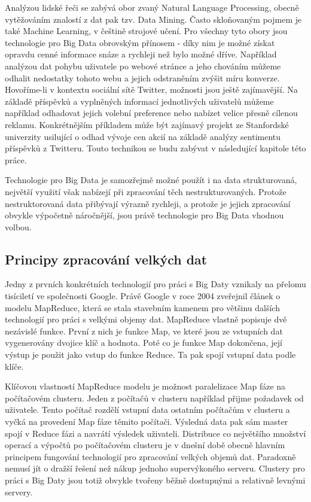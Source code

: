 \documentclass[thesis=B,czech]{FITthesis}[2012/06/26]
\begin{document}
	Analýzou lidské řeči se zabývá obor zvaný Natural Language Processing, obecně vytěžováním znalostí z dat pak tzv. Data Mining. Často skloňovaným pojmem je také Machine Learning, v češtině strojové učení. Pro všechny tyto obory jsou technologie pro Big Data obrovským přínosem - díky nim je možné získat opravdu cenné informace snáze a rychleji než bylo možné dříve. Například analýzou dat pohybu uživatele po webové stránce a jeho chováním můžeme odhalit nedostatky tohoto webu a jejich odstraněním zvýšit míru konverze. Hovoříme-li v kontextu sociální sítě Twitter, možnosti jsou ještě zajímavější. Na základě příspěvků a vyplněných informací jednotlivých uživatelů můžeme například odhadovat jejich volební preference nebo nabízet velice přesně cílenou reklamu. Konkrétnějším příkladem může být zajímavý projekt ze Stanfordské univerzity usilující o odhad vývoje cen akcií na základě analýzy sentimentu příspěvků z Twitteru\cite{stock-stanford}. Touto technikou se budu zabývat v následující kapitole této práce.  

	Technologie pro Big Data je samozřejmě možné použít i na data strukturovaná, největší využití však nabízejí při zpracování těch nestrukturovaných. Protože nestruktorovaná data přibývají výrazně rychleji\cite{structured-unstructured}, a protože je jejich zpracování obvykle výpočetně náročnější, jsou právě technologie pro Big Data vhodnou volbou. 
 
	
\subsection{Principy zpracování velkých dat}
	Jedny z prvních konkrétních technologií pro práci s Big Daty vznikaly na přelomu tisíciletí ve společnosti Google. Právě Google v roce 2004 zveřejnil článek o modelu MapReduce\cite{mapreduce-google}, která se stala stavebním kamenem pro většinu dalších technologií pro práci s velkými objemy dat. MapReduce vlastně popisuje dvě nezávislé funkce. První z nich je funkce Map, ve které jsou ze vstupních dat vygenerovány dvojice klíč a hodnota. Poté co je funkce Map dokončena, její výstup je použit jako vstup do funkce Reduce. Ta pak spojí vstupní data podle klíče\cite{mapreduce-description}. 
	
	Klíčovou vlastností MapReduce modelu je možnost paralelizace Map fáze na počítačovém clusteru. Jeden z počítačů v clusteru například přijme požadavek od uživatele. Tento počítač rozdělí vstupní data ostatním počítačům v clusteru a vyčká na provedení Map fáze těmito počítači. Výsledná data pak sám master spojí v Reduce fázi a navrátí výsledek uživateli. Distribuce co největšího množství operací a výpočtů po počítačovém clusteru je v dnešní době obecně hlavním principem fungování technologií pro zpracování velkých objemů dat. Paradoxně nemusí jít o dražší řešení než nákup jednoho supervýkoného serveru. Clustery pro práci s Big Daty jsou totiž obvykle tvořeny běžně dostupnými a relativně levnými servery. 
	
\end{document}
